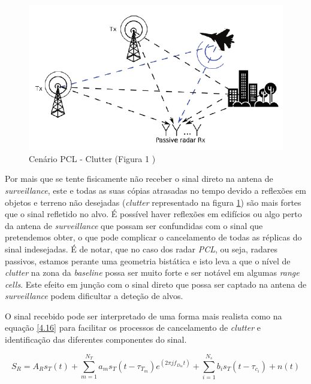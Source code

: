 \begin{figure}[h]
\centering
\includegraphics[scale=0.6]{chapters/ch4/assets/clutter}
\caption[Cenário PCL - Clutter]{Cenário PCL - Clutter (Figura 1 \cite{Peto2018})}
\label{fig:clutter}
\end{figure}


Por mais que se tente fisicamente não receber o sinal direto na antena de \textit{surveillance}, este e todas as suas cópias atrasadas no tempo devido a reflexões em objetos e terreno não desejadas (\textit{clutter} representado na figura \ref{fig:clutter}) são mais fortes que o sinal refletido no alvo. É possível haver reflexões em edifícios ou algo perto da antena de \textit{surveillance} que possam ser confundidas com o sinal que pretendemos obter, o que pode complicar o cancelamento de todas as réplicas do sinal indesejadas. É de notar, que no caso dos radar \textit{\gls{PCL}}, ou seja, radares passivos, estamos perante uma geometria bistática e isto leva a que o nível de \textit{clutter} na zona da \textit{baseline} possa ser muito forte e ser notável em algumas \textit{range cells}. Este efeito em junção com o sinal direto que possa ser captado na antena de \textit{surveillance} podem dificultar a deteção de alvos.\par 
O sinal recebido pode ser interpretado de uma forma mais realista como na equação \ref{4.16} para facilitar os processos de cancelamento de \textit{clutter} e identificação das diferentes componentes do sinal.


\begin{equation} \label{4.16}
S_{R}=A_{R}s_{T}\left( t\right)+\sum_{m=1}^{N_{T}}a_{m}s_{T}\left( t-\tau_{T_{m}}\right)e^{\left( 2\pi j f_{D_{m}}t\right)}+\sum_{i=1}^{N_{s}}b_{i}s_{T}\left( t-\tau_{c_{i}}\right)+n\left( t\right)    
\end{equation}

